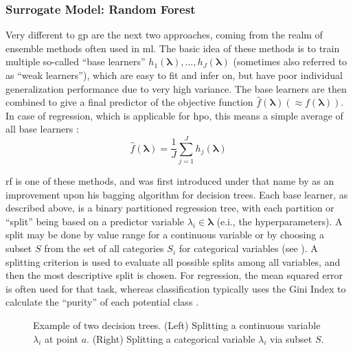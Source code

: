 \subsubsection{Surrogate Model: Random Forest}
\label{chap:rf}
Very different to \gls{gp} are the next two approaches, coming from the realm of ensemble methods often used in \gls{ml}. The basic idea of these methods is to train multiple so-called \enquote{base learners} $h_1(\mathbf{\lambda}), ...,h_J(\mathbf{\lambda})$ (sometimes also referred to as \enquote{weak learners}), which are easy to fit and infer on, but have poor individual generalization performance due to very high variance. The base learners are then combined to give a final predictor of the objective function $\hat{f}(\mathbf{\lambda}) (\approx f(\mathbf{\lambda}))$. In case of regression, which is applicable for \gls{hpo}, this means a simple average of all base learners \cite{cutler2012random}:
\begin{equation}
	\label{eq:avg-est}
	\hat{f}(\mathbf{\lambda}) = \frac{1}{J} \sum_{j=1}^{J} h_j(\mathbf{\lambda})
\end{equation}

\gls{rf} is one of these methods, and was first introduced under that name by \citet{breiman2001random} as an improvement upon his bagging algorithm for decision trees.
Each base learner, as described above, is a binary partitioned regression tree, with each partition or \enquote{split} being based on a predictor variable $\lambda_i \in \mathbf{\lambda}$ (e.i., the hyperparameters). A split may be done by value range for a continuous variable or by choosing a subset $S$ from the set of all categories $S_i$ for categorical variables (see ). A splitting criterion is used to evaluate all possible splits among all variables, and then the most descriptive split is chosen. For regression, the mean squared error is often used for that task, whereas classification typically uses the Gini Index to calculate the \enquote{purity} of each potential class \cite{cutler2012random}. 

\begin{figure}
	\centering
	\caption[Example of decision trees]{Example of two decision trees. (Left) Splitting a continuous variable $\lambda_i$ at point $a$. (Right) Splitting a categorical variable $\lambda_i$ via subset $S$.}
	\label{fig:decision-tree}
\end{figure}

